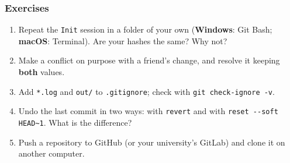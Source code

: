 \documentclass[aspectratio=169,10pt,compress]{beamer}
\newcommand{\win}{\textbf{Windows}}
\newcommand{\mac}{\textbf{macOS}}
\begin{document}
\begin{frame}[t,fragile] \frametitle{Exercises}
  \begin{enumerate}\small
    \item Repeat the \texttt{Init} session in a folder of your own (\win: Git Bash; \mac: Terminal). Are your hashes the same? Why not?
    \item Make a conflict on purpose with a friend's change, and resolve it keeping \textbf{both} values.
    \item Add \texttt{*.log} and \texttt{out/} to \texttt{.gitignore}; check with \texttt{git check-ignore -v}.
    \item Undo the last commit in two ways: with \texttt{revert} and with \texttt{reset -{}-soft HEAD\textasciitilde1}. What is the difference?
    \item Push a repository to GitHub (or your university's GitLab) and clone it on another computer.
  \end{enumerate}
\end{frame}




\begin{frame}[t,fragile]
	\begin{center}
		\vspace{4cm}
	\end{center}
\end{frame}
\end{document}
